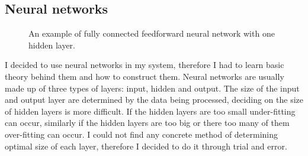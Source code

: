 \documentclass[12pt,a4paper]{book}
\def\layersep{2.5cm}
\begin{document}
\subsection{Neural networks}
\begin{figure}[ht]
\centering
{}
\caption{An example of fully connected feedforward neural network with one hidden layer.}
\label{fig:neural-network}
\end{figure}
I decided to use neural networks in my system, therefore I had to learn basic theory behind them and how to construct them.
Neural networks are usually made up of three types of layers: input, hidden and output.
The size of the input and output layer are determined by the data being processed, deciding on the size of hidden layers is more difficult.
If the hidden layers are too small under-fitting can occur, similarly if the hidden layers are too big or there too many of them over-fitting can occur.
I could not find any concrete method of determining optimal size of each layer, therefore I decided to do it through trial and error.
\end{document}
